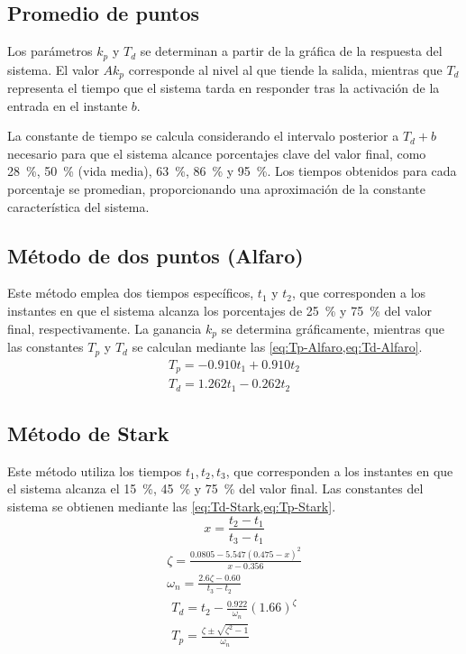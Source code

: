 \subsection{Promedio de puntos}

Los parámetros \(k_p\) y \(T_d\) se determinan a partir de la gráfica de la
respuesta del sistema. El valor \(A k_p\) corresponde al nivel al que tiende
la salida, mientras que \(T_d\) representa el tiempo que el sistema tarda en
responder tras la activación de la entrada en el instante \(b\).

La constante de tiempo se calcula considerando el intervalo posterior a
\(T_d + b\) necesario para que el sistema alcance porcentajes clave del
valor final, como \qty{28}{\percent}, \qty{50}{\percent} (vida media),
\qty{63}{\percent}, \qty{86}{\percent} y \qty{95}{\percent}. Los tiempos
obtenidos para cada porcentaje se promedian, proporcionando una aproximación
de la constante característica del sistema.

\subsection{Método de dos puntos (Alfaro)}

Este método emplea dos tiempos específicos, \(t_1\) y \(t_2\), que corresponden
a los instantes en que el sistema alcanza los porcentajes de \qty{25}{\percent}
y \qty{75}{\percent} del valor final, respectivamente. La ganancia \(k_p\) se
determina gráficamente, mientras que las constantes \(T_p\) y \(T_d\) se
calculan mediante las \cref{eq:Tp-Alfaro,eq:Td-Alfaro}.
\cite{ruiz-2011}
\begin{gather}
  T_p = -0.910 t_1 + 0.910 t_2 \label{eq:Tp-Alfaro} \\
  T_d = 1.262 t_1 - 0.262 t_2 \label{eq:Td-Alfaro}
\end{gather}

\subsection{Método de Stark}

Este método utiliza los tiempos \(t_1, t_2, t_3\), que corresponden a los
instantes en que el sistema alcanza el \qty{15}{\percent}, \qty{45}{\percent}
y \qty{75}{\percent} del valor final.
Las constantes del sistema se obtienen mediante las \cref{eq:Td-Stark,eq:Tp-Stark}.
\begin{equation}
  x = \frac{t_2 - t_1}{t_3 - t_1}
\end{equation}
\begin{gather}
  \zeta = \frac{0.0805 - 5.547 \left(0.475 - x\right)^2}{x - 0.356} \label{eq:ζ-Stark} \\
  \omega_n = \frac{2.6 \zeta - 0.60}{t_3 - t_2} \label{eq:ω-Stark}
\end{gather}
\begin{gather}
  T_d = t_2 - \frac{0.922}{\omega_n}(1.66)^{\zeta} \label{eq:Td-Stark} \\
  T_p = \frac{\zeta \pm \sqrt{\zeta^2 - 1}}{\omega_n} \label{eq:Tp-Stark}
\end{gather}


